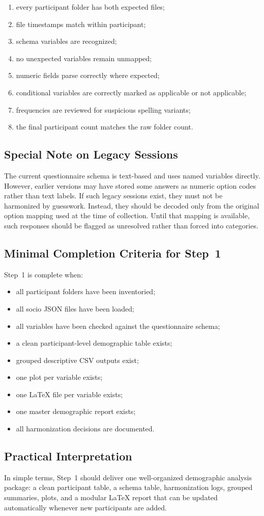 \begin{enumerate}
    \item every participant folder has both expected files;
    \item file timestamps match within participant;
    \item schema variables are recognized;
    \item no unexpected variables remain unmapped;
    \item numeric fields parse correctly where expected;
    \item conditional variables are correctly marked as applicable or not applicable;
    \item frequencies are reviewed for suspicious spelling variants;
    \item the final participant count matches the raw folder count.
\end{enumerate}

\subsection{Special Note on Legacy Sessions}
The current questionnaire schema is text-based and uses named variables directly.
However, earlier versions may have stored some answers as numeric option codes rather than text labels.
If such legacy sessions exist, they must not be harmonized by guesswork.
Instead, they should be decoded only from the original option mapping used at the time of collection.
Until that mapping is available, such responses should be flagged as unresolved rather than forced into categories.

\subsection{Minimal Completion Criteria for Step~1}
Step~1 is complete when:
\begin{itemize}
    \item all participant folders have been inventoried;
    \item all socio JSON files have been loaded;
    \item all variables have been checked against the questionnaire schema;
    \item a clean participant-level demographic table exists;
    \item grouped descriptive CSV outputs exist;
    \item one plot per variable exists;
    \item one \LaTeX{} file per variable exists;
    \item one master demographic report exists;
    \item all harmonization decisions are documented.
\end{itemize}

\subsection{Practical Interpretation}
In simple terms, Step~1 should deliver one well-organized demographic analysis package:
a clean participant table, a schema table, harmonization logs, grouped summaries, plots, and a modular
\LaTeX{} report that can be updated automatically whenever new participants are added.
